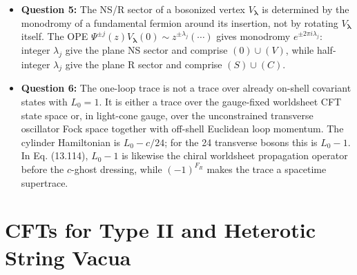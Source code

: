 \documentclass[
  10pt,
  a4paper,
  openany]{book}
\begin{document}
\begin{itemize}
  contour argument to D-brane supersymmetry currents preserves
  \(Q_L+P Q_R\); GSO chirality then requires even \(p\) in type IIA and
  odd \(p\) in type IIB.
\item
  \textbf{Question 5:} The NS/R sector of a bosonized vertex
  \(V_{\boldsymbol\lambda}\) is determined by the monodromy of a
  fundamental fermion around its insertion, not by rotating
  \(V_{\boldsymbol\lambda}\) itself. The OPE
  \(\Psi^{\pm j}(z)V_{\boldsymbol\lambda}(0)\sim z^{\pm\lambda_j}(\cdots)\)
  gives monodromy \(e^{\pm2\pi i\lambda_j}\): integer \(\lambda_j\) give
  the plane NS sector and comprise \((0)\cup(V)\), while half-integer
  \(\lambda_j\) give the plane R sector and comprise \((S)\cup(C)\).
\item
  \textbf{Question 6:} The one-loop trace is not a trace over already
  on-shell covariant states with \(L_0=1\). It is either a trace over
  the gauge-fixed worldsheet CFT state space or, in light-cone gauge,
  over the unconstrained transverse oscillator Fock space together with
  off-shell Euclidean loop momentum. The cylinder Hamiltonian is
  \(L_0-c/24\); for the 24 transverse bosons this is \(L_0-1\). In Eq.
  (13.114), \(L_0-1\) is likewise the chiral worldsheet propagation
  operator before the \(c\)-ghost dressing, while \((-1)^{F_R}\) makes
  the trace a spacetime supertrace.
\end{itemize}

\section{CFTs for Type II and Heterotic String
Vacua}\label{cfts-for-type-ii-and-heterotic-string-vacua}
\end{document}
